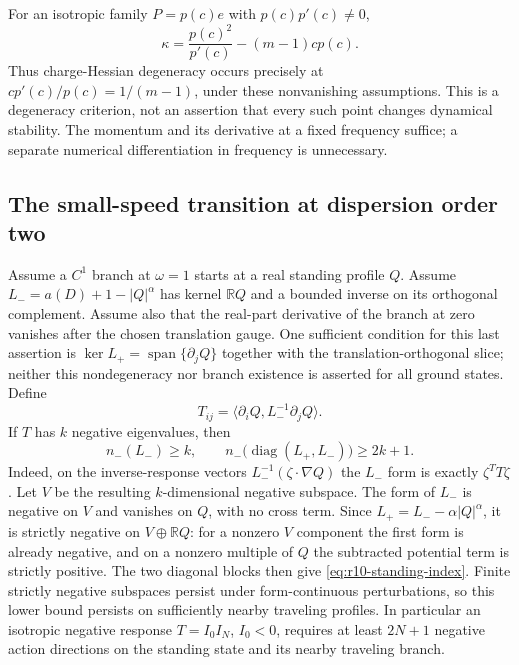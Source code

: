 For an isotropic family $P=p(c)e$ with $p(c)p'(c)\ne0$,
\begin{equation}\label{eq:r10-elasticity}
 \kappa=\frac{p(c)^2}{p'(c)}-(m-1)cp(c).
\end{equation}
Thus charge-Hessian degeneracy occurs precisely at
$cp'(c)/p(c)=1/(m-1)$, under these nonvanishing assumptions.
This is a degeneracy criterion, not an assertion that every such
point changes dynamical stability.  The momentum and its derivative
at a fixed frequency suffice; a separate numerical differentiation
in frequency is unnecessary.

\subsection{The small-speed transition at dispersion order two}

Assume a $C^1$ branch at $\omega=1$ starts at a real standing
profile $Q$.  Assume $L_-=a(D)+1-|Q|^\alpha$ has kernel
$\mathbb RQ$ and a bounded inverse on its orthogonal complement.
Assume also that the real-part derivative of the branch at zero
vanishes after the chosen translation gauge.  One sufficient
condition for this last assertion is
$\ker L_+=\operatorname{span}\{\partial_jQ\}$ together with
the translation-orthogonal slice; neither this nondegeneracy nor
branch existence is asserted for all ground states.
Define
\[
 T_{ij}=\langle\partial_iQ,L_-^{-1}\partial_jQ\rangle.
\]
If $T$ has $k$ negative eigenvalues, then
\begin{equation}\label{eq:r10-standing-index}
 n_-(L_-)\ge k,\qquad
 n_-\bigl(\operatorname{diag}(L_+,L_-)\bigr)\ge2k+1.
\end{equation}
Indeed, on the inverse-response vectors $L_-^{-1}(\zeta\cdot\nabla Q)$
the $L_-$ form is exactly $\zeta^TT\zeta$.  Let $V$ be the resulting
$k$-dimensional negative subspace.  The form of $L_-$ is negative
on $V$ and vanishes on $Q$, with no cross term.  Since
$L_+=L_--\alpha|Q|^\alpha$, it is strictly negative on
$V\oplus\mathbb RQ$: for a nonzero $V$ component the first form is
already negative, and on a nonzero multiple of $Q$ the subtracted
potential term is strictly positive.  The two diagonal blocks then
give \eqref{eq:r10-standing-index}.
Finite strictly negative subspaces persist under form-continuous
perturbations, so this lower bound persists on sufficiently nearby
traveling profiles.  In particular an isotropic negative response
$T=I_0I_N$, $I_0<0$, requires at least $2N+1$ negative action
directions on the standing state and its nearby traveling branch.

